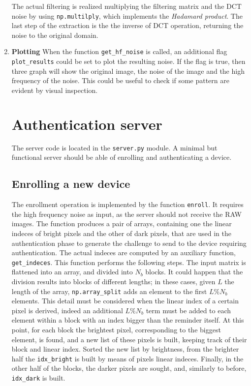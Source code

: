 \begin{enumerate}
        The actual filtering is realized multiplying the filtering matrix and the DCT noise by using \texttt{np.multilply}, which implements the \emph{Hadamard product}. The last step of the extraction is the the inverse of DCT operation, returning the noise to the original domain.
  \item \textbf{Plotting}
        When the function \texttt{get\_hf\_noise} is called, an additional flag \texttt{plot\_results} could be set to plot the resulting noise. If the flag is true, then three graph will show the original image, the noise of the image and the high frequency of the noise. This could be useful to check if some pattern are evident by visual inspection.

        \section{Authentication server}\label{sec:authserver}
        The server code is located in the \texttt{server.py} module. A minimal but functional server should be able of enrolling and authenticating a device.

        \subsection{Enrolling a new device}\label{subsec:enrollment}
        The enrollment operation is implemented by the function \texttt{enroll}. It requires the high frequency noise as input, as the server should not receive the RAW images. The function produces a pair of arrays, containing one the linear indeces of bright pixels and the other of dark pixels, that are used in the authentication phase to generate the challenge to send to the device requiring authentication.
        The actual indeces are computed by an auxiliary function, \texttt{get\_indeces}. This function performs the following steps. The input matrix is flattened into an array, and divided into $N_{b}$ blocks.
        It could happen that the division results into blocks of different lengths; in these cases, given $L$ the length of the array, \texttt{np.array\_split} adds an element to the first $L \% N_{b}$ elements. This detail must be considered when the linear index of a certain pixel is derived, indeed an additional $L \% N_{b}$ term must be added to each element within a block with an index bigger than the reminder itself.
        At this point, for each block the brightest pixel, corresponding to the biggest element, is found, and a new list of these pixels is built, keeping track of their block and linear index.
        Sorted the new list by brightness, from the brighter half the \texttt{idx\_bright}
        is built by means of pixels linear indeces. Finally, in the other half of the blocks, the darker pixels are sought, and, similarly to before, \texttt{idx\_dark} is built.


\end{enumerate}
